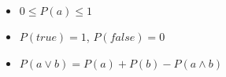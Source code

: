 \documentclass[A4,11pt]{article}
\begin{document}
\thispagestyle{empty}

\begin{itemize}
\item $0\leq P(a)\leq 1$
\item $P(true)=1$, $P(false) = 0$
\item $P(a\vee b) = P(a) + P(b) - P(a\wedge b)$
\end{itemize}
\end{document}
